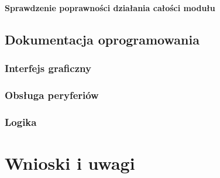 \documentclass[12pt, eng, twoside, openany, final]{mgr}
\begin{document}
            \subsubsection{Sprawdzenie poprawności działania całości modułu}
            
            \section{Dokumentacja oprogramowania}
                \subsection{Interfejs graficzny}
                \subsection{Obsługa peryferiów}
                \subsection{Logika}
            
            
%
%
\chapter{Wnioski i uwagi}
\thispagestyle{fancy}
  \cite{CleanCode,EffectiveModern,RpiBeginner}




\end{document}

